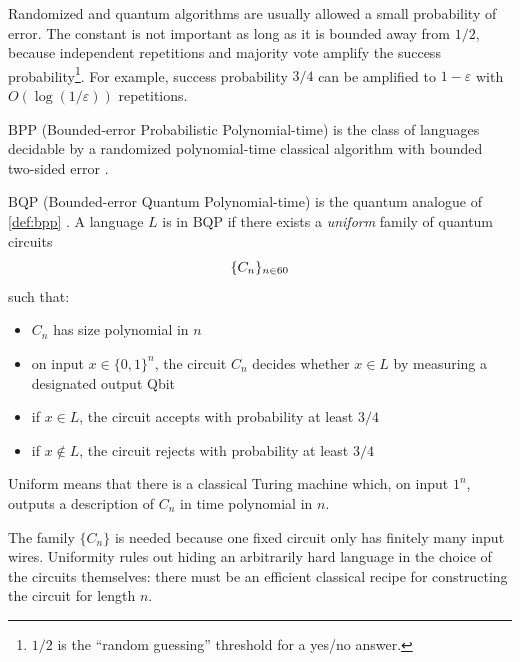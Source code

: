 Randomized and quantum algorithms are usually allowed a small probability of error.
The constant is not important as long as it is bounded away from \(1/2\),
because independent repetitions and majority vote amplify the success probability\footnote{$1/2$ is the ``random guessing'' threshold for a yes/no answer.}.
For example, success probability \(3/4\) can be amplified to \(1-\varepsilon\) with \(O(\log(1/\varepsilon))\) repetitions.


\begin{definition}[BPP]\label{def:bpp}
\(\mathrm{BPP}\) (Bounded-error Probabilistic Polynomial-time) is the class of languages decidable by a randomized polynomial-time classical algorithm with bounded two-sided error \cite{nielsenChuangQCQI}.
\end{definition}

\pagebreak[3]

\begin{definition}[BQP]\label{def:bqp}
\(\mathrm{BQP}\) (Bounded-error Quantum Polynomial-time) is the quantum analogue of \autoref{def:bpp} \cite{nielsenChuangQCQI}.
A language \(L\) is in \(\mathrm{BQP}\) if there exists a \emph{uniform} family of quantum circuits
\[
\{C_n\}_{n\in60}
\]
such that:
\begin{itemize}
\item
\(C_n\) has size polynomial in \(n\)
\item
on input \(x\in\{0,1\}^{n}\), the circuit \(C_n\) decides whether \(x\in L\) by measuring a designated output Qbit
\item
if \(x\in L\), the circuit accepts with probability at least \(3/4\)
\item
if \(x\notin L\), the circuit rejects with probability at least \(3/4\)
\end{itemize}
Uniform means that there is a classical Turing machine which, on input \(1^n\), outputs a description of \(C_n\) in time polynomial in \(n\).
\end{definition}

The family \(\{C_n\}\) is needed because one fixed circuit only has finitely many input wires.
Uniformity rules out hiding an arbitrarily hard language in the choice of the circuits themselves:
there must be an efficient classical recipe for constructing the circuit for length \(n\).

